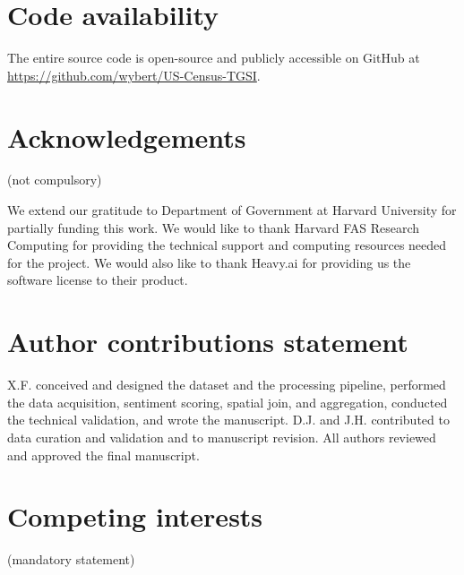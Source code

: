 \documentclass[fleqn,10pt]{wlscirep}
\begin{document}
\section*{Code availability}


The entire source code is open-source and publicly accessible on GitHub at \url{https://github.com/wybert/US-Census-TGSI}.





\section*{Acknowledgements} (not compulsory)


We extend our gratitude to Department of Government  at Harvard University for partially funding this work. We would like to thank Harvard FAS Research Computing for providing the technical support and computing resources needed for the project. We would also like to thank Heavy.ai for providing us the software license to their product.


\section*{Author contributions statement}

X.F. conceived and designed the dataset and the processing pipeline, performed the data acquisition, sentiment scoring, spatial join, and aggregation, conducted the technical validation, and wrote the manuscript. D.J. and J.H. contributed to data curation and validation and to manuscript revision. All authors reviewed and approved the final manuscript.

\section*{Competing interests} (mandatory statement)
\end{document}
